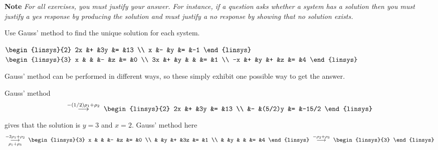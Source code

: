 \smallskip
\noindent\textbf{Note}\hspace*{.4em}
\textit{For all exercises,
you must justify your answer.
For instance, if a question asks whether a system has a solution then you
must justify a yes response by producing the solution and must justify 
a no response by showing that no solution exists.}
\begin{exercises}
  \recommended \item 
    Use Gauss' method to find the unique solution for each system.
    \begin{exparts*}
      \partsitem 
        $\begin{linsys}{2}
          2x  &+  &3y  &=  &13  \\
          x   &-  &y   &=  &-1
        \end{linsys}$
      \partsitem 
        $\begin{linsys}{3}
          x   &  &  &-  &z  &=  &0  \\
          3x  &+ &y &   &   &=  &1  \\
          -x  &+ &y &+  &z  &=  &4
        \end{linsys}$
    \end{exparts*}
    \begin{answer}
      Gauss' method can be performed in different ways, so these simply 
      exhibit one possible way to get the answer.
      \begin{exparts}
        \partsitem Gauss' method
          \begin{equation*}
            \grstep{-(1/2)\rho_1+\rho_2}\;
            \begin{linsys}{2}
               2x  &+  &3y      &=  &13  \\
                   &-  &(5/2)y  &=  &-15/2              
            \end{linsys}
          \end{equation*}
          gives that the solution is $y=3$ and $x=2$.
        \partsitem Gauss' method here
          \begin{equation*}
            \grstep[\rho_1+\rho_3]{-3\rho_1+\rho_2}\;
            \begin{linsys}{3}
              x   &  &  &-  &z  &=  &0  \\
                  &  &y &+  &3z &=  &1  \\
                  &  &y &   &   &=  &4
            \end{linsys}
            \;\grstep{-\rho_2+\rho_3}\;
            \begin{linsys}{3}

\end{linsys}
\end{equation*}
\end{exparts}
\end{answer}
\end{exercises}
